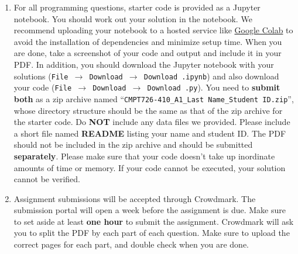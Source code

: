\documentclass[10pt]{article}
\begin{document}
\begin{enumerate}
    \item For all programming questions, starter code is provided as a Jupyter notebook. You should work out your solution in the notebook. We recommend uploading your notebook to a hosted service like \href{https://colab.research.google.com/}{Google Colab} to avoid the installation of dependencies and minimize setup time. When you are done, take a screenshot of your code and output and include it in your PDF. In addition, you should download the Jupyter notebook with your solutions (\texttt{File $\rightarrow$ Download $\rightarrow$ Download .ipynb}) and also download your code (\texttt{File $\rightarrow$ Download $\rightarrow$ Download .py}). You need to \textbf{submit both} as a zip archive named ``\texttt{CMPT726-410\_A1\_\textlangle Last Name\textrangle\_\textlangle Student ID\textrangle.zip}'', whose directory structure should be the same as that of the zip archive for the starter code. Do \textbf{NOT} include any data files we provided. Please include a short file named \textbf{README} listing your name and student ID. The PDF should not be included in the zip archive and should be submitted \textbf{separately}. Please make sure that your code doesn't take up inordinate amounts of time or memory. If your code cannot be executed, your solution cannot be verified. 
    
    \item Assignment submissions will be accepted through Crowdmark. The submission portal will open a week before the assignment is due. Make sure to set aside at least \textbf{one hour} to submit the assignment. Crowdmark will ask you to split the PDF by each part of each question. Make sure to upload the correct pages for each part, and double check when you are done. 
\end{enumerate}
\end{document}
